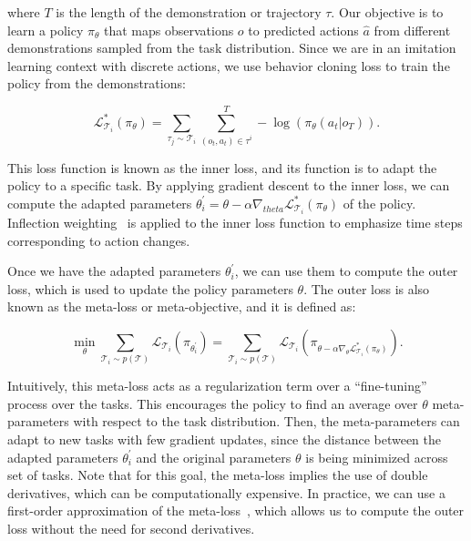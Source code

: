 where $T$ is the length of the demonstration or trajectory $\tau$.
Our objective is to learn a policy $\pi_\theta$ that maps observations $o$ to predicted actions $\hat{a}$ from different demonstrations sampled from the task distribution.
Since we are in an imitation learning context with discrete actions, we use behavior cloning loss to train the policy from the demonstrations:

\begin{equation}
    \mathcal{L}^*_{\mathcal{T}_i}(\pi_\theta) = \sum_{\tau_j \sim \mathcal{T}_i} \sum_{(o_t, a_t) \in \tau^i}^T -\log (\pi_\theta(a_t|o_T)).
    \label{eq:loss_metanav}
\end{equation}

This loss function is known as the inner loss, and its function is to adapt the policy to a specific task.
By applying gradient descent to the inner loss, we can compute the adapted parameters $\theta^\prime_i = \theta-\alpha\nabla_{theta}\mathcal{L}^*_{\mathcal{T}_i}(\pi_\theta)$ of the policy.
Inflection weighting~\cite{wijmans2019b} is applied to the inner loss function to emphasize time steps corresponding to action changes.

Once we have the adapted parameters $\theta^\prime_i$, we can use them to compute the outer loss, which is used to update the policy parameters $\theta$.
The outer loss is also known as the meta-loss or meta-objective, and it is defined as:

\begin{equation}
    \min _{\theta} \sum_{\mathcal{T}_i \sim p(\mathcal{T})} \mathcal{L}_{\mathcal{T}_i}\left(\pi_{\theta_i^{\prime}}\right)=\sum_{\mathcal{T}_i \sim p(\mathcal{T})} \mathcal{L}_{\mathcal{T}_i}\left(\pi_{\theta-\alpha \nabla_\theta \mathcal{L}_{\mathcal{T}_i}^*\left(\pi_\theta\right)}\right).
    \label{eq:meta_loss_metanav}
\end{equation}

Intuitively, this meta-loss acts as a regularization term over a ``fine-tuning'' process over the tasks.
This encourages the policy to find an average over $\theta$ meta-parameters with respect to the task distribution.
Then, the meta-parameters can adapt to new tasks with few gradient updates, since the distance between the adapted parameters $\theta^\prime_i$ and the original parameters $\theta$ is being minimized across set of tasks.
Note that for this goal, the meta-loss implies the use of double derivatives, which can be computationally expensive.
In practice, we can use a first-order approximation of the meta-loss~\cite{finn2017}, which allows us to compute the outer loss without the need for second derivatives.

